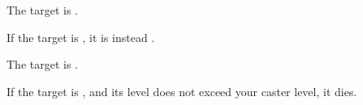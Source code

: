 \begin{spellheader}
    \spellrng{\rngclose}
    \begin{spelltargetinginfo}
    \end{spelltargetinginfo}
    \begin{spelleffects}
    \end{spelleffects}
\end{spellheader}
\begin{spellcontent}
    \spelleffect The target is \bewildered.

    If the target is \bloodied, it is instead \confused.
    \spelldur{\durshort}
\end{spellcontent}
\begin{spellfooter}

\end{spellfooter}

\begin{spellheader}
    \spellrng{\rngclose}
    \begin{spelltargetinginfo}
    \end{spelltargetinginfo}
    \begin{spelleffects}
    \end{spelleffects}
\end{spellheader}
\begin{spellcontent}
    \spelleffect The target is \sickened.

    If the target is \bloodied, and its level does not exceed your caster level, it dies.
    \spelldur{\durshort}
\end{spellcontent}
\begin{spellfooter}

\end{spellfooter}

